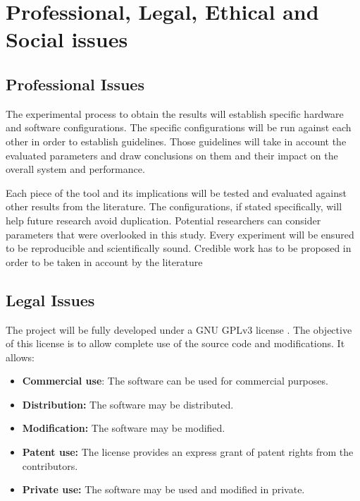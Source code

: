 
\chapter{Professional, Legal, Ethical and Social issues} %

\label{Chapter5} %



\section{Professional Issues}

The experimental process to obtain the results will establish specific hardware and software configurations. The specific configurations will be run against each other in order to establish guidelines. Those guidelines will take in account the evaluated parameters and draw conclusions on them and their impact on the overall system and performance.

Each piece of the tool and its implications will be tested and evaluated against other results from the literature. The configurations, if stated specifically, will help future research avoid duplication. Potential researchers can consider parameters that were overlooked in this study. Every experiment will be ensured to be reproducible and scientifically sound. Credible work has to be proposed in order to be taken in account by the literature


\section{Legal Issues}

The project will be fully developed under a GNU GPLv3 license \cite{GNUGPL}. The objective of this license is to allow complete use of the source code and modifications. It allows:

\begin{itemize}
  \item \textbf{Commercial use}: The software can be used for commercial purposes.
  \item \textbf{Distribution:} The software may be distributed.
  \item \textbf{Modification:} The software may be modified.
  \item \textbf{Patent use:} The license provides an express grant of patent rights from the contributors.
  \item \textbf{Private use:} The software may be used and modified in private.
\end{itemize}

